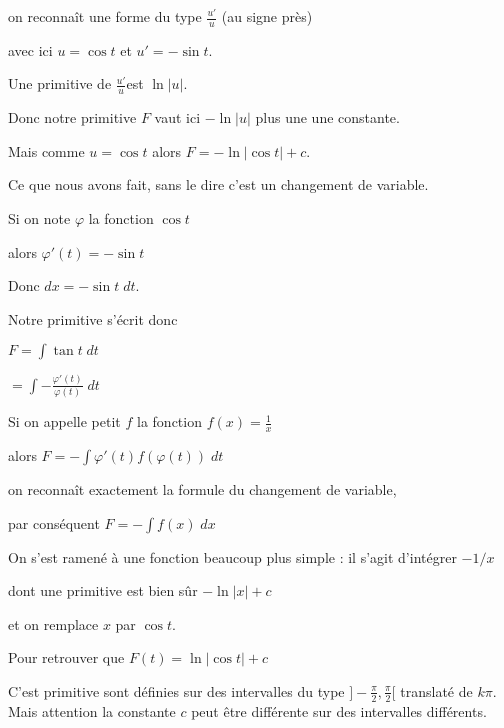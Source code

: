 \change

on reconnaît une forme du type $\frac{u'}{u}$ (au signe près)

avec ici $u=\cos t$ et $u'=-\sin t$.

\change

Une primitive de $\frac{u'}{u}$est $\ln|u|$.

\change

Donc notre primitive $F$ vaut ici $-\ln|u|$ plus une une constante.

Mais comme $u=\cos t$ alors $F = -\ln|\cos t|+c$.

\change

Ce que nous avons fait, sans le dire c'est un changement de variable.

Si on note $\varphi$ la fonction $\cos t$

\change 

alors $\varphi'(t) = -\sin t$

Donc $dx = -\sin t \; dt$.

Notre primitive s'écrit donc 

\change

$F = \int \tan t \; dt$

\change

$= \int -\frac{\varphi'(t)}{\varphi(t)} \; dt$

\change

Si on appelle petit $f$ la fonction $f(x)=\frac1x$

\change

alors $F = - \int \varphi'(t) f(\varphi(t))\; dt$

\change

 on reconnaît exactement la formule du changement de variable,

par conséquent 
$F = -\int f(x) \; dx$


\change

On s'est ramené à une fonction beaucoup plus simple :
il s'agit d'intégrer $-1/x$

\change

dont une primitive est bien sûr $- \ln|x|+c $

\change

et on remplace $x$ par $\cos t$.

Pour retrouver que $F(t) = \ln|\cos t| + c$

C'est primitive sont définies sur des intervalles du type 
$]-\frac{\pi}{2}, \frac{\pi}{2}[$ translaté de $k\pi$.
Mais attention la constante $c$ peut être différente sur des intervalles différents.


